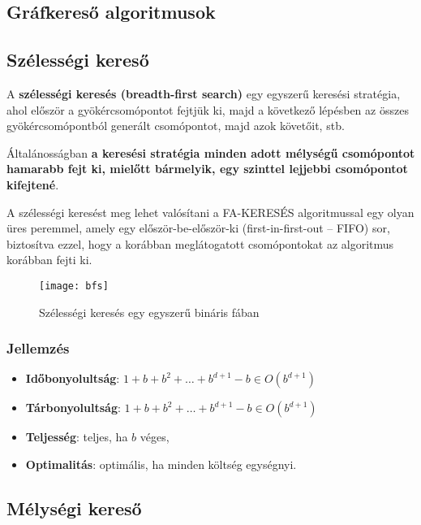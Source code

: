 \subsection{Gráfkereső algoritmusok}


\subsection{Szélességi kereső}

A {\bf szélességi keresés (breadth-first search)} egy egyszerű keresési
stratégia, ahol először a gyökércsomópontot fejtjük ki, majd a következő
lépésben az összes gyökércsomópontból generált csomópontot, majd azok követőit,
stb.

Általánosságban {\bf a keresési stratégia minden adott mélységű csomópontot hamarabb
fejt ki, mielőtt bármelyik, egy szinttel lejjebbi csomópontot kifejtené}.

A szélességi keresést meg lehet valósítani a FA-KERESÉS algoritmussal egy olyan
üres peremmel, amely egy először-be-először-ki (first-in-first-out – FIFO) sor,
biztosítva ezzel, hogy a korábban meglátogatott csomópontokat az algoritmus
korábban fejti ki.

\begin{figure}[H]
    \centering
    \texttt{[image: bfs]}
    \caption{Szélességi keresés egy egyszerű bináris fában}
    \label{fig:bfs}
\end{figure}

\subsubsection{Jellemzés}

\begin{itemize}
    \item {\bf Időbonyolultság}: $1 + b + b^2 + \ldots + b^{d+1} - b \in O(b^{d+1})$
    \item {\bf Tárbonyolultság}: $1 + b + b^2 + \ldots + b^{d+1} - b \in O(b^{d+1})$
    \item {\bf Teljesség}: teljes, ha $b$ véges,
    \item {\bf Optimalitás}: optimális, ha minden költség egységnyi.
\end{itemize}

\subsection{Mélységi kereső}

